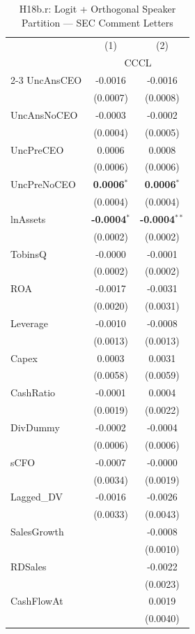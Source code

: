 \documentclass[11pt,a4paper]{article}
\begin{document}
\begin{table}[htbp]
\centering
\caption{H18b.r: Logit + Orthogonal Speaker Partition --- SEC Comment Letters}
\label{tab:h18b_robust}
\scriptsize
\begin{tabular}{lcc}
\toprule
 & (1) & (2) \\
 & \multicolumn{2}{c}{CCCL} \\
\cmidrule(lr){2-3}
\midrule
UncAnsCEO & -0.0016 & -0.0016 \\
 & (0.0007) & (0.0008) \\
UncAnsNoCEO & -0.0003 & -0.0002 \\
 & (0.0004) & (0.0005) \\
UncPreCEO & 0.0006 & 0.0008 \\
 & (0.0006) & (0.0006) \\
UncPreNoCEO & \textbf{0.0006}$^{*}$ & \textbf{0.0006}$^{*}$ \\
 & (0.0004) & (0.0004) \\
\midrule
lnAssets & \textbf{-0.0004}$^{*}$ & \textbf{-0.0004}$^{**}$ \\
 & (0.0002) & (0.0002) \\
TobinsQ & -0.0000 & -0.0001 \\
 & (0.0002) & (0.0002) \\
ROA & -0.0017 & -0.0031 \\
 & (0.0020) & (0.0031) \\
Leverage & -0.0010 & -0.0008 \\
 & (0.0013) & (0.0013) \\
Capex & 0.0003 & 0.0031 \\
 & (0.0058) & (0.0059) \\
CashRatio & -0.0001 & 0.0004 \\
 & (0.0019) & (0.0022) \\
DivDummy & -0.0002 & -0.0004 \\
 & (0.0006) & (0.0006) \\
sCFO & -0.0007 & -0.0000 \\
 & (0.0034) & (0.0019) \\
Lagged\_DV & -0.0016 & -0.0026 \\
 & (0.0033) & (0.0043) \\
SalesGrowth &  & -0.0008 \\
 &  & (0.0010) \\
RDSales &  & -0.0022 \\
 &  & (0.0023) \\
CashFlowAt &  & 0.0019 \\
 &  & (0.0040) \\

\end{tabular}
\end{table}
\end{document}
